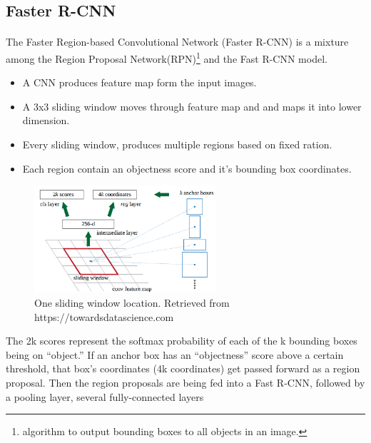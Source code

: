\documentclass[12pt]{report}
\begin{document}
                \subsection{Faster R-CNN}
                \paragraph{}
                The Faster Region-based Convolutional Network (Faster R-CNN) is a  mixture among  
                the Region Proposal Network(RPN)\footnote{algorithm to output bounding boxes to all objects in an image.} 
                and the Fast R-CNN model.
                \begin{itemize}
                \item A CNN produces feature map form the input images.
                \item A 3x3 sliding window moves through feature map and and maps it into lower dimension.
                \item Every sliding window, produces multiple regions based on fixed ration.
                \item Each region contain an objectness score and it's bounding box coordinates.
                \end{itemize}
                \begin{figure}[h]
                \centering
                \includegraphics[width=0.6\textwidth]{./images/cfm.png}
                \caption{One sliding window location. Retrieved from https://towardsdatascience.com}
                \label{fig:frcnn}
                \end{figure} 
                The 2k scores represent the softmax probability of each of the k bounding boxes being on “object.”
                If an anchor box has an “objectness” score above a certain threshold, that box’s coordinates (4k coordinates) get passed forward as a region proposal.
                Then the region proposals are being fed into a Fast R-CNN, followed by a pooling layer, several fully-connected layers
\end{document}
